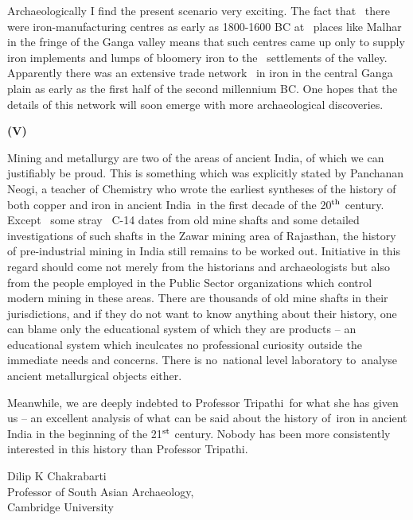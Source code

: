 Archaeologically I find the present scenario very exciting. The fact that  there were iron-manufacturing centres as early as 1800-1600 BC at  places like Malhar in the fringe of the Ganga valley means that such centres came up only to supply iron implements and lumps of bloomery iron to the  settlements of the valley. Apparently there was an extensive trade network  in iron in the central Ganga plain as early as the first half of the second millennium BC. One hopes that the details of this network will soon emerge with more archaeological discoveries.

\vspace{-.3cm}

\begin{center}{\textbf{(V)}}\end{center}

\vspace{-.3cm}

Mining and metallurgy are two of the areas of ancient India, of which we can justifiably be proud. This is something which was explicitly stated by Panchanan Neogi, a teacher of Chemistry who wrote the earliest syntheses of the history of both copper and iron in ancient India in the first decade of the 20$^{\rm th}$ century. Except  some stray  C-14 dates from old mine shafts and some detailed investigations of such shafts in the Zawar mining area of Rajasthan, the history of pre-industrial mining in India still remains to be worked out. Initiative in this regard should come not merely from the historians and archaeologists but also from the people employed in the Public Sector organizations which control modern mining in these areas. There are thousands of old mine shafts in their jurisdictions, and if they do not want to know anything about their history, one can blame only the educational system of which they are products – an educational system which inculcates no professional curiosity outside the immediate needs and concerns. There is no national level laboratory to analyse ancient metallurgical objects either.

Meanwhile, we are deeply indebted to Professor Tripathi for what she has given us – an excellent analysis of what can be said about the history of iron in ancient India in the beginning of the 21$^{\rm st}$ century. Nobody has been more consistently interested in this history than Professor Tripathi.

Dilip K Chakrabarti\\ Professor of South Asian Archaeology,\\ Cambridge University
